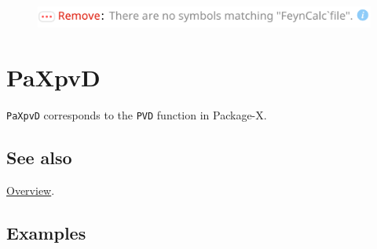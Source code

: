 \documentclass[../FeynHelpersManual.tex]{subfiles}
\begin{document}
\FloatBarrier
\begin{figure}[!ht]
\centering
\includegraphics[width=0.6\linewidth]{img/1p1tg4rvundxc.pdf}
\end{figure}
\FloatBarrier

\hypertarget{paxpvd}{
\section{PaXpvD}\label{paxpvd}}

\texttt{PaXpvD} corresponds to the \texttt{PVD} function in Package-X.

\subsection{See also}

\hyperlink{toc}{Overview}.

\subsection{Examples}
\end{document}
